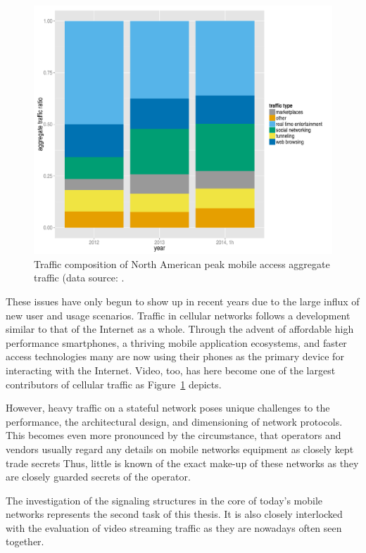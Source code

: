 \begin{figure}[htb]
    \centering
    \includegraphics[width=1.0\textwidth]{images/r-netvine-phenomena-mobile.pdf}
    \caption{Traffic composition of North American peak mobile access aggregate traffic (data source: \cite{sandvine_internetphenomena}.} %
\label{c1:fig:traffic-netvine-mobile}
\end{figure}

These issues have only begun to show up in recent years due to the large influx of new user and usage scenarios. Traffic in cellular networks follows a development similar to that of the Internet as a whole. Through the advent of affordable high performance smartphones, a thriving mobile application ecosystems, and faster access technologies many are now using their phones as the primary device for interacting with the Internet. Video, too, has here become one of the largest contributors of cellular traffic as Figure~\ref{c1:fig:traffic-netvine-mobile} depicts.

However, heavy traffic on a stateful network poses unique challenges to the performance, the architectural design, and dimensioning of network protocols. This becomes even more pronounced by the circumstance, that operators and vendors usually regard any details on mobile networks equipment as closely kept trade secrets Thus, little is known of the exact make-up of these networks as they are closely guarded secrets of the operator.

The investigation of the signaling structures in the core of today's mobile networks represents the second task of this thesis. It is also closely interlocked with the evaluation of video streaming traffic as they are nowadays often seen together.


